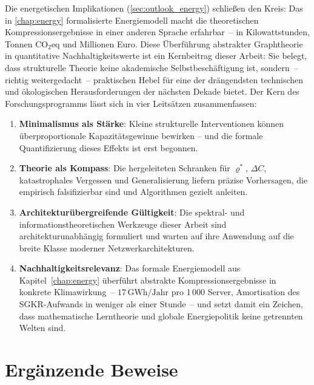 ﻿\documentclass[12pt, a4paper, openany]{report}
\begin{document}
Die energetischen Implikationen (\cref{sec:outlook_energy}) schließen
den Kreis: Das in \cref{chap:energy} formalisierte Energiemodell macht
die theoretischen Kompressionsergebnisse in einer anderen Sprache erfahrbar~--
in Kilowattstunden, Tonnen CO$_2$eq und Millionen Euro.
Diese Überführung abstrakter Graphtheorie in quantitative
Nachhaltigkeitswerte ist ein Kernbeitrag dieser Arbeit: Sie belegt, dass
strukturelle Theorie keine akademische Selbstbeschäftigung ist, sondern~--
richtig weitergedacht~-- praktischen Hebel für eine der drängendsten
technischen und ökologischen Herausforderungen der nächsten Dekade bietet.
Der Kern des Forschungsprogramms lässt sich in vier Leitsätzen
zusammenfassen:
\begin{enumerate}[label=(\roman*)]
  \item \textbf{Minimalismus als Stärke}: Kleine strukturelle Interventionen
    können überproportionale Kapazitätsgewinne bewirken -- und die formale
    Quantifizierung dieses Effekts ist erst begonnen.
  \item \textbf{Theorie als Kompass}: Die hergeleiteten Schranken für
    $\varrho^*$, $\Delta C$, katastrophales Vergessen und Generalisierung
    liefern präzise Vorhersagen, die empirisch falsifizierbar sind und
    Algorithmen gezielt anleiten.
  \item \textbf{Architekturübergreifende Gültigkeit}: Die spektral-
    und informationstheoretischen Werkzeuge dieser Arbeit sind
    architekturunabhängig formuliert und warten auf ihre Anwendung auf
    die breite Klasse moderner Netzwerkarchitekturen.
  \item \textbf{Nachhaltigkeitsrelevanz}: Das formale Energiemodell aus
    Kapitel~\ref{chap:energy} überführt abstrakte Kompressionsergebnisse
    in konkrete Klimawirkung~-- $17\,\mathrm{GWh/Jahr}$ pro 1\,000 Server,
    Amortisation des SGKR-Aufwands in weniger als einer Stunde~-- und
    setzt damit ein Zeichen, dass mathematische Lerntheorie und globale
    Energiepolitik keine getrennten Welten sind.
\end{enumerate}

\appendix
\chapter{Ergänzende Beweise}
\label{app:proofs}
\end{document}
